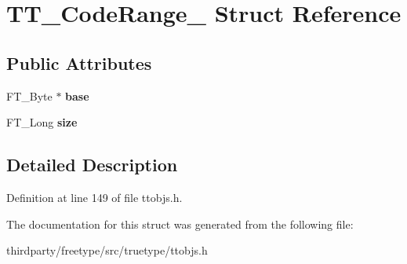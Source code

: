 \hypertarget{struct_t_t___code_range__}{}\section{T\+T\+\_\+\+Code\+Range\+\_\+ Struct Reference}
\label{struct_t_t___code_range__}
\subsection*{Public Attributes}
\begin{DoxyCompactItemize}
\item 
\mbox{\label{struct_t_t___code_range___a1dda9a59f41191cd109596f0bb79264a}} 
F\+T\+\_\+\+Byte $\ast$ {\bfseries base}
\item 
\mbox{\label{struct_t_t___code_range___ae061e7e1a1cbd13502f6100bc03ba3be}} 
F\+T\+\_\+\+Long {\bfseries size}
\end{DoxyCompactItemize}


\subsection{Detailed Description}


Definition at line 149 of file ttobjs.\+h.



The documentation for this struct was generated from the following file\+:\begin{DoxyCompactItemize}
\item 
thirdparty/freetype/src/truetype/ttobjs.\+h\end{DoxyCompactItemize}
